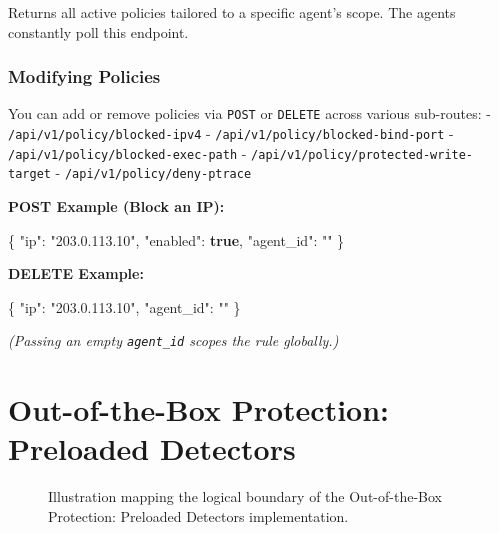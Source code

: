 \documentclass[
  12pt,
]{report}
\newenvironment{Shaded}{}{}
\newcommand{\DataTypeTok}[1]{\textcolor[rgb]{0.56,0.13,0.00}{#1}}
\newcommand{\FunctionTok}[1]{\textcolor[rgb]{0.02,0.16,0.49}{#1}}
\newcommand{\KeywordTok}[1]{\textcolor[rgb]{0.00,0.44,0.13}{\textbf{#1}}}
\newcommand{\StringTok}[1]{\textcolor[rgb]{0.25,0.44,0.63}{#1}}
\begin{document}
Returns all active policies tailored to a specific agent's scope. The
agents constantly poll this endpoint.

\subsection{Modifying Policies}\label{modifying-policies}

You can add or remove policies via \texttt{POST} or \texttt{DELETE}
across various sub-routes: - \texttt{/api/v1/policy/blocked-ipv4} -
\texttt{/api/v1/policy/blocked-bind-port} -
\texttt{/api/v1/policy/blocked-exec-path} -
\texttt{/api/v1/policy/protected-write-target} -
\texttt{/api/v1/policy/deny-ptrace}

\textbf{POST Example (Block an IP):}

\begin{Shaded}
\begin{Highlighting}[]
\FunctionTok{\{}
  \DataTypeTok{"ip"}\FunctionTok{:} \StringTok{"203.0.113.10"}\FunctionTok{,}
  \DataTypeTok{"enabled"}\FunctionTok{:} \KeywordTok{true}\FunctionTok{,}
  \DataTypeTok{"agent\_id"}\FunctionTok{:} \StringTok{""} 
\FunctionTok{\}}
\end{Highlighting}
\end{Shaded}

\textbf{DELETE Example:}

\begin{Shaded}
\begin{Highlighting}[]
\FunctionTok{\{}
  \DataTypeTok{"ip"}\FunctionTok{:} \StringTok{"203.0.113.10"}\FunctionTok{,}
  \DataTypeTok{"agent\_id"}\FunctionTok{:} \StringTok{""} 
\FunctionTok{\}}
\end{Highlighting}
\end{Shaded}

\emph{(Passing an empty \texttt{agent\_id} scopes the rule globally.)}

\clearpage

\chapter{Out-of-the-Box Protection: Preloaded
Detectors}\label{out-of-the-box-protection-preloaded-detectors}

\begin{figure}[h]
\centering
\vspace{5cm}
\caption{Illustration mapping the logical boundary of the Out-of-the-Box Protection: Preloaded Detectors implementation.}
\end{figure}
\end{document}
